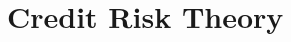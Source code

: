 \documentclass[main.tex]{subfiles}
\begin{document}
    \part{Credit Risk Theory}

    
    
    
    
    
\end{document}
